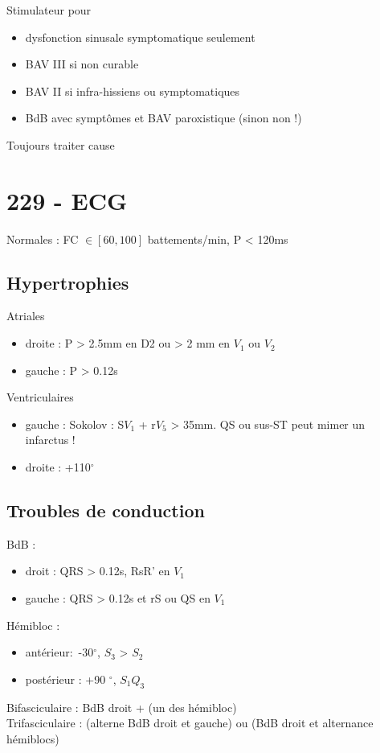 Stimulateur pour 
\begin{itemize}
  \item dysfonction sinusale symptomatique seulement
  \item BAV III si non curable
  \item BAV II si infra-hissiens ou symptomatiques
  \item BdB avec symptômes et BAV paroxistique (sinon non !)
\end{itemize}
Toujours traiter cause

\section{229 - ECG}%
\label{sec:229_ecg}
Normales : FC $\in [60, 100]$ battements/min, P < 120ms

\subsection{Hypertrophies}

Atriales
\begin{itemize}
  \item droite : P > 2.5mm en D2 ou > 2 mm en $V_1$ ou $V_2$
  \item gauche : P > 0.12s
\end{itemize}
Ventriculaires
\begin{itemize}
  \item gauche : Sokolov : S$V_1$ + r$V_5$ > 35mm. \danger{} QS ou sus-ST peut
    mimer un infarctus !
  \item droite : +110$^{\circ}$
\end{itemize}

\subsection{Troubles de conduction}
BdB :
\begin{itemize}
  \item droit : QRS > 0.12s, RsR' en $V_1$ 
  \item gauche : QRS > 0.12s et rS ou QS en $V_1$
\end{itemize}
Hémibloc : 
\begin{itemize}
  \item antérieur: -30$^{\circ}$, $S_3$ > $S_2$
  \item postérieur : +90 $^{\circ}$, $S_1 Q_3$
\end{itemize}
Bifasciculaire : BdB droit + (un des hémibloc)\\
Trifasciculaire \skull : (alterne BdB droit et gauche) ou (BdB droit et
alternance hémiblocs)

